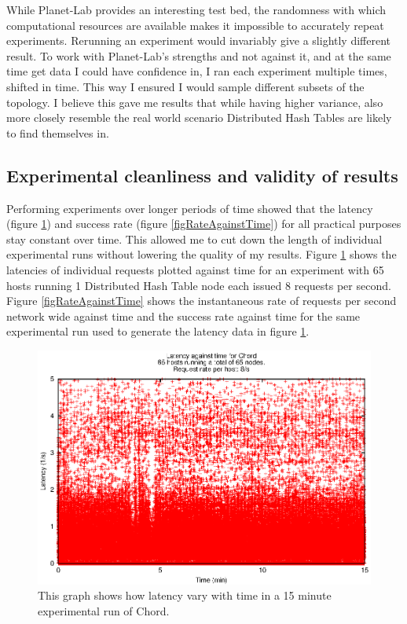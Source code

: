While Planet-Lab provides an interesting test bed, the randomness with which computational resources are available makes it impossible to accurately repeat experiments. Rerunning an experiment would invariably give a slightly different result.
To work with Planet-Lab's strengths and not against it, and at the same time get data I could have confidence in, I ran each experiment multiple times, shifted in time. This way I ensured I would sample different subsets of the topology. I believe this gave me results that while having higher variance, also more closely resemble the real world scenario Distributed Hash Tables are likely to find themselves in.

\subsection{Experimental cleanliness and validity of results}
Performing experiments over longer periods of time showed that the latency (figure \ref{figLatencyAgainstTime}) and success rate (figure \ref{figRateAgainstTime}) for all practical purposes stay constant over time.
This allowed me to cut down the length of individual experimental runs without lowering the quality of my results.
Figure \ref{figLatencyAgainstTime} shows the latencies of individual requests plotted against time for an experiment with 65 hosts running 1 Distributed Hash Table node each issued 8 requests per second.
Figure \ref{figRateAgainstTime} shows the instantaneous rate of requests per second network wide against time and the success rate against time for the same experimental run used to generate the latency data in figure \ref{figLatencyAgainstTime}. 

\begin{figure}[!htbp]
  \begin{center}
    \includegraphics[width=0.9\linewidth]{illustrations/latency_aginst_time_chord.eps}
    \caption{This graph shows how latency vary with time in a 15 minute experimental run of Chord.}
    \label{figLatencyAgainstTime}
  \end{center}
\end{figure}

